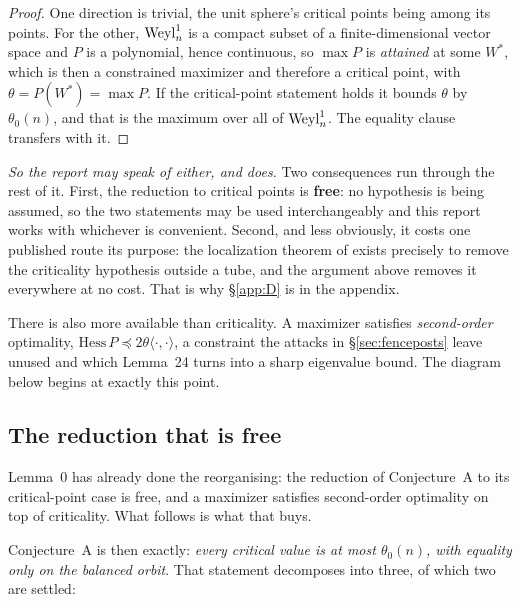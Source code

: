 \begin{proof}
One direction is trivial, the unit sphere's critical points being among its points. For the other, $\mathrm{Weyl}^1_n$ is a compact subset of a finite-dimensional vector space and $P$ is a polynomial, hence continuous, so $\max P$ is \emph{attained} at some $W^{*}$, which is then a constrained maximizer and therefore a critical point, with $\theta=P(W^{*})=\max P$. If the critical-point statement holds it bounds $\theta$ by $\theta_0(n)$, and that is the maximum over all of $\mathrm{Weyl}^1_n$. The equality clause transfers with it.
\end{proof}

\emph{So the report may speak of either, and does.} Two consequences run through the rest of it. First, the reduction to critical points is \textbf{free}: no hypothesis is being assumed, so the two statements may be used interchangeably and this report works with whichever is convenient. Second, and less obviously, it costs one published route its purpose: the localization theorem of \cite{nienhaus2023} exists precisely to remove the criticality hypothesis outside a tube, and the argument above removes it everywhere at no cost. That is why \S\ref{app:D} is in the appendix.

There is also more available than criticality. A maximizer satisfies \emph{second-order} optimality, $\mathrm{Hess}\,P\preceq2\theta\langle\cdot,\cdot\rangle$, a constraint the attacks in \S\ref{sec:fenceposts} leave unused and which Lemma~24 turns into a sharp eigenvalue bound. The diagram below begins at exactly this point.

\subsection{The reduction that is free}

Lemma~0 has already done the reorganising: the reduction of Conjecture~A to its critical-point case is free, and a maximizer satisfies second-order optimality on top of criticality. What follows is what that buys.

Conjecture~A is then exactly: \emph{every critical value is at most $\theta_0(n)$, with equality only on the balanced orbit}. That statement decomposes into three, of which two are settled:

